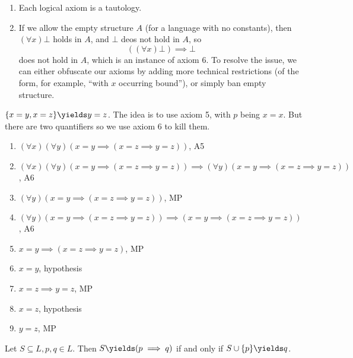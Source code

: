 \documentclass[a4paper]{article}
\begin{document}
\begin{note}\leavevmode
  \label{note:empty structure}
  \begin{enumerate}
  \item Each logical axiom is a tautology.
  \item If we allow the empty structure \(A\) (for a language with no constants), then \((\forall x) \bot \) holds in \(A\), and \(\bot\) deos not hold in \(A\), so
    \[
      ((\forall x) \bot) \implies \bot
    \]
    does not hold in \(A\), which is an instance of axiom 6. To resolve the issue, we can either obfuscate our axioms by adding more technical restrictions (of the form, for example, ``with \(x\) occurring bound''), or simply ban empty structure.
  \end{enumerate}
\end{note}

\begin{eg}
  \(\{x = y, x = z\} \yields y = z\). The idea is to use axiom 5, with \(p\) being \(x = x\). But there are two quantifiers so we use axiom 6 to kill them.
  \begin{enumerate}
  \item \((\forall x) (\forall y) (x = y \implies (x = z \implies y = z))\), A5
  \item \((\forall x) (\forall y) (x = y \implies (x = z \implies y = z)) \implies (\forall y)(x = y \implies (x = z \implies y = z))\), A6
  \item \((\forall y) (x = y \implies (x = z \implies y = z))\), MP
  \item \((\forall y) (x = y \implies (x = z \implies y = z)) \implies (x = y \implies (x = z \implies y = z))\), A6
  \item \(x = y \implies (x = z \implies y = z)\), MP
  \item \(x = y\), hypothesis
  \item \(x = z \implies y = z\), MP
  \item \(x = z\), hypothesis
  \item \(y = z\), MP
  \end{enumerate}
\end{eg}

\begin{proposition}
  Let \(S \subseteq L, p, q \in L\). Then \(S \yields (p \implies q)\) if and only if \(S \cup \{p\} \yields q\).
\end{proposition}
\end{document}
